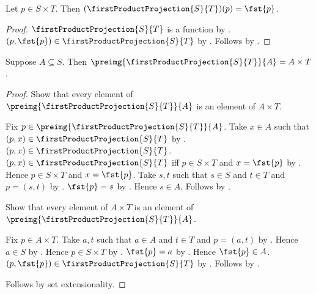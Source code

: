 \begin{proposition}\label{first_product_projection_apply}
    Let $p\in S\times T$.
    Then $(\firstProductProjection{S}{T})(p)=\fst{p}$.
\end{proposition}
\begin{proof}
    $\firstProductProjection{S}{T}$ is a function by
        .
    $(p,\fst{p})\in\firstProductProjection{S}{T}$ by
        .
    Follows by .
\end{proof}

\begin{proposition}\label{first_product_projection_preimage}
    Suppose $A\subseteq S$.
    Then $\preimg{\firstProductProjection{S}{T}}{A}=A\times T$.
\end{proposition}
\begin{proof}
    Show that every element of
        $\preimg{\firstProductProjection{S}{T}}{A}$ is an element of
        $A\times T$.
    \begin{subproof}
        Fix $p\in\preimg{\firstProductProjection{S}{T}}{A}$.
        Take $x\in A$ such that
            $(p,x)\in\firstProductProjection{S}{T}$ by .
        $(p,x)\in\firstProductProjection{S}{T}$.
        $(p,x)\in\firstProductProjection{S}{T}$ iff
            $p\in S\times T$ and $x=\fst{p}$ by
            .
        Hence $p\in S\times T$ and $x=\fst{p}$.
        Take $s,t$ such that $s\in S$ and $t\in T$ and $p=(s,t)$ by
            .
        $\fst{p}=s$ by .
        Hence $s\in A$.
        Follows by .
    \end{subproof}
    Show that every element of $A\times T$ is an element of
        $\preimg{\firstProductProjection{S}{T}}{A}$.
    \begin{subproof}
        Fix $p\in A\times T$.
        Take $a,t$ such that $a\in A$ and $t\in T$ and $p=(a,t)$ by
            .
        Hence $a\in S$ by .
        Hence $p\in S\times T$ by .
        $\fst{p}=a$ by .
        Hence $\fst{p}\in A$.
        $(p,\fst{p})\in\firstProductProjection{S}{T}$ by
            .
        Follows by .
    \end{subproof}
    Follows by set extensionality.
\end{proof}

